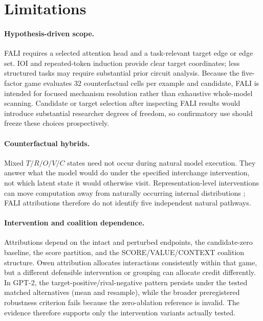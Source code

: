 \section{Limitations}\label{sec:limitations}

\paragraph{Hypothesis-driven scope.}
FALI requires a selected attention head and a task-relevant target edge or edge set. IOI and repeated-token induction provide clear target coordinates; less structured tasks may require substantial prior circuit analysis. Because the five-factor game evaluates 32 counterfactual cells per example and candidate, FALI is intended for focused mechanism resolution rather than exhaustive whole-model scanning. Candidate or target selection after inspecting FALI results would introduce substantial researcher degrees of freedom, so confirmatory use should freeze these choices prospectively.

\paragraph{Counterfactual hybrids.}
Mixed $T/R/O/V/C$ states need not occur during natural model execution. They answer what the model would do under the specified interchange intervention, not which latent state it would otherwise visit. Representation-level interventions can move computation away from naturally occurring internal distributions \citep{grant2025divergent}; FALI attributions therefore do not identify five independent natural pathways.

\paragraph{Intervention and coalition dependence.}
Attributions depend on the intact and perturbed endpoints, the candidate-zero baseline, the score partition, and the SCORE/VALUE/CONTEXT coalition structure. Owen attribution allocates interactions consistently within that game, but a different defensible intervention or grouping can allocate credit differently. In GPT-2, the target-positive/rival-negative pattern persists under the tested matched alternatives (mean and resample), while the broader preregistered robustness criterion fails because the zero-ablation reference is invalid. The evidence therefore supports only the intervention variants actually tested.

